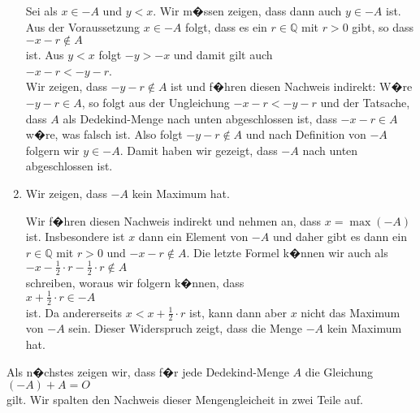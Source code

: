 \begin{enumerate}
      Sei als $x \in -\!A$ und $y < x$.  Wir m�ssen zeigen, dass dann auch $y \in -\!A$ ist.
      Aus der Voraussetzung  $x \in -\!A$ folgt, dass es ein $r \in \mathbb{Q}$ mit $r>0$ gibt,
      so dass 
      \\[0.2cm]
      \hspace*{1.3cm}
      $-x - r \not\in A$ 
      \\[0.2cm]
      ist.  Aus  $y < x$ folgt $-y > -x$ und damit gilt auch
      \\[0.2cm]
      \hspace*{1.3cm}
      $-x - r < -y - r$.
      \\[0.2cm]
      Wir zeigen, dass $-y - r \not\in A$ ist und f�hren diesen Nachweis indirekt:  W�re 
      $-y - r \in A$, so folgt aus der Ungleichung $-x - r < -y - r$ und der Tatsache, dass $A$ als
      Dedekind-Menge nach unten abgeschlossen ist, dass $-x - r \in A$ w�re, was falsch ist.
      Also folgt $-y - r \not\in A$ und nach Definition von $-\!A$ folgern wir $y \in -\!A$.
      Damit haben wir gezeigt, dass $-\!A$ nach unten abgeschlossen ist.
\item Wir zeigen, dass $-\!A$ kein Maximum hat.

      Wir f�hren diesen Nachweis indirekt und nehmen an, dass $x = \max(-\!A)$ ist.
      Insbesondere ist $x$ dann ein Element von $-\!A$ und daher gibt es dann ein $r \in \mathbb{Q}$
      mit $r>0$ und $-x - r \not\in A$.  Die letzte Formel k�nnen wir auch als
      \\[0.2cm]
      \hspace*{1.3cm}
      $-x - \frac{1}{2} \cdot r - \frac{1}{2} \cdot r \not\in A$
      \\[0.2cm]
      schreiben, woraus wir folgern k�nnen, dass
      \\[0.2cm]
      \hspace*{1.3cm}
      $x + \frac{1}{2} \cdot r \in -\!A$
      \\[0.2cm]
      ist.  Da andererseits $x < x + \frac{1}{2} \cdot r$ ist, kann dann aber $x$ nicht das Maximum
      von $-\!A$ sein.  Dieser Widerspruch zeigt, dass die Menge $-\!A$ kein Maximum hat.
\end{enumerate}
Als n�chstes zeigen wir, dass f�r jede Dedekind-Menge $A$ die Gleichung
\\[0.2cm]
\hspace*{1.3cm}
$(-\!A) + A = O$ 
\\[0.2cm]
gilt.  Wir spalten den Nachweis dieser Mengengleicheit in zwei Teile auf.
